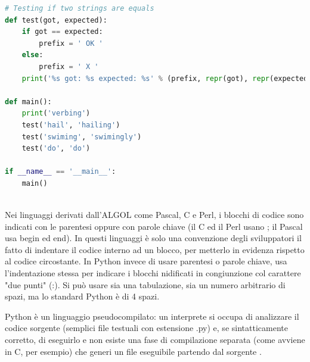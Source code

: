 \lstset{style=python_code_style}
\begin{lstlisting}[language=Python, caption={Esempio di programma scritto in Python}]
# Testing if two strings are equals
def test(got, expected):
	if got == expected:
		prefix = ' OK '
	else:
		prefix = ' X '
	print('%s got: %s expected: %s' % (prefix, repr(got), repr(expected)))

def main():
	print('verbing')
	test('hail', 'hailing')
	test('swiming', 'swimingly')
	test('do', 'do')

if __name__ == '__main__':
	main()
\end{lstlisting}
\ \\
Nei linguaggi derivati dall'ALGOL come Pascal, C e Perl, i blocchi di codice sono indicati con le parentesi oppure con parole chiave 
(il C ed il Perl usano { }; il Pascal usa begin ed end). In questi linguaggi è solo una convenzione degli sviluppatori il fatto di 
indentare il codice interno ad un blocco, per metterlo in evidenza rispetto al codice circostante. In Python invece di usare parentesi 
o parole chiave, usa l'indentazione stessa per indicare i blocchi nidificati in congiunzione col carattere "due punti" (:). Si può usare 
sia una tabulazione, sia un numero arbitrario di spazi, ma lo standard Python è di 4 spazi. 

Python è un linguaggio pseudocompilato: un interprete si occupa di analizzare il codice sorgente (semplici file testuali con 
estensione .py) e, se sintatticamente corretto, di eseguirlo e non esiste una fase di compilazione separata (come 
avviene in C, per esempio) che generi un file eseguibile partendo dal sorgente \cite{python-documentation}.

